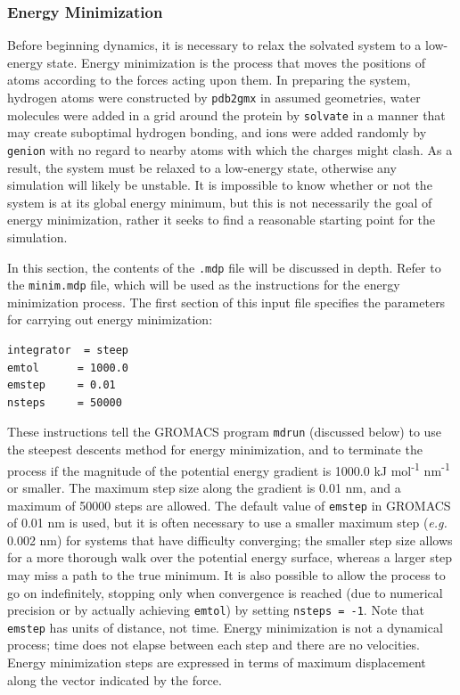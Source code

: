 \documentclass[9pt,tutorial,pubversion]{livecoms}
\begin{document}
\subsubsection{Energy Minimization} \label{lyso_em}

Before beginning dynamics, it is necessary to relax the solvated system to a low-energy state. Energy minimization is the process that moves the positions of atoms according to the forces acting upon them. In preparing the system, hydrogen atoms were constructed by \texttt{pdb2gmx} in assumed geometries, water molecules were added in a grid around the protein by \texttt{solvate} in a manner that may create suboptimal hydrogen bonding, and ions were added randomly by \texttt{genion} with no regard to nearby atoms with which the charges might clash. As a result, the system must be relaxed to a low-energy state, otherwise any simulation will likely be unstable. It is impossible to know whether or not the system is at its global energy minimum, but this is not necessarily the goal of energy minimization, rather it seeks to find a reasonable starting point for the simulation.

In this section, the contents of the \texttt{.mdp} file will be discussed in depth. Refer to the \texttt{minim.mdp} file, which will be used as the instructions for the energy minimization process. The first section of this input file specifies the parameters for carrying out energy minimization:

\begin{lstlisting}
integrator	= steep
emtol      = 1000.0
emstep     = 0.01
nsteps     = 50000
\end{lstlisting}

These instructions tell the GROMACS program \texttt{mdrun} (discussed below) to use the steepest descents method for energy minimization, and to terminate the process if the magnitude of the potential energy gradient is 1000.0 kJ mol\textsuperscript{-1} nm\textsuperscript{-1} or smaller. The maximum step size along the gradient is 0.01 nm, and a maximum of 50000 steps are allowed. The default value of \texttt{emstep} in GROMACS of 0.01 nm is used, but it is often necessary to use a smaller maximum step ({\em e.g.} 0.002 nm) for systems that have difficulty converging; the smaller step size allows for a more thorough walk over the potential energy surface, whereas a larger step may miss a path to the true minimum. It is also possible to allow the process to go on indefinitely, stopping only when convergence is reached (due to numerical precision or by actually achieving \texttt{emtol}) by setting \texttt{nsteps = -1}. Note that \texttt{emstep} has units of distance, not time. Energy minimization is not a dynamical process; time does not elapse between each step and there are no velocities. Energy minimization steps are expressed in terms of maximum displacement along the vector indicated by the force.
\end{document}
